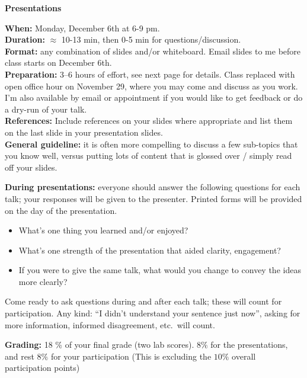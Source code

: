 \documentclass[11pt]{article}%
\begin{document}
\begin{center}
\Large\textbf{Presentations}
\end{center}

\textbf{When:} Monday, December 6th at 6-9 pm. \\
\textbf{Duration:} $\approx$ 10-13 min, then 0-5 min for
questions/discussion. \\
\textbf{Format:} any combination of slides and/or whiteboard.
Email slides to me before class starts on December 6th. \\
\textbf{Preparation:} 3--6 hours of effort, see next page for details.
Class replaced with open office hour on November 29, where you may come and
discuss as you work.  I'm also available by email or appointment if you
would like to get feedback or do a dry-run of your talk. \\
\textbf{References:} Include references on your slides where appropriate and list them on the last slide in your presentation slides. \\
\textbf{General guideline:} it is often more compelling to discuss a few
sub-topics that you know well, versus putting lots of content that is glossed
over / simply read off your slides.

\vspace{1em}

\textbf{During presentations:} everyone should answer the following questions
for each talk; your responses will be given to the presenter.  Printed forms
will be provided on the day of the presentation.
\begin{itemize}[noitemsep]
    \item What's one thing you learned and/or enjoyed?
    \item What's one strength of the presentation that aided clarity, engagement?
    \item If you were to give the same talk, what would you change to convey
        the ideas more clearly?
\end{itemize}
Come ready to ask questions during and after each talk; these will count for
participation.  Any kind: ``I didn't understand your sentence just now'',
asking for more information, informed disagreement, etc.~will count.

\vspace{1em}

\textbf{Grading:} 18 \% of your final grade (two lab scores).  $8\%$ for the presentations, and rest $8\%$ for your participation (This is excluding the $10\%$ overall participation points)
\end{document}
